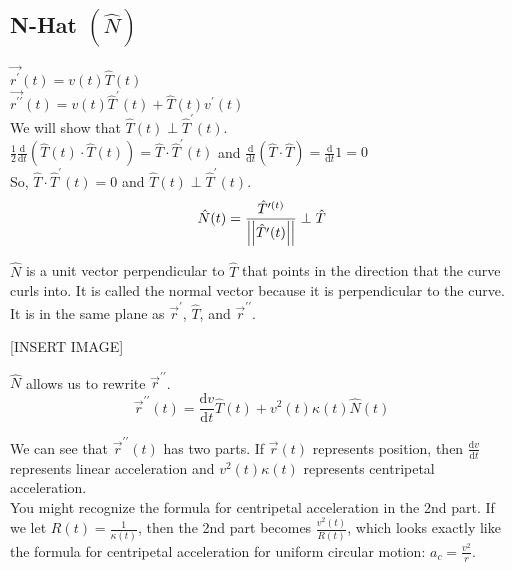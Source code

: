 \subsection{N-Hat $\left(\hat{N}\right)$}
\noindent
$\vec{r^{\prime}}(t)=v(t)\hat{T}(t)$\\
$\vec{r^{\prime\prime}}(t)=v(t)\hat{T}^{\prime}(t)+\hat{T}(t)v^{\prime}(t)$\\

\noindent
We will show that $\hat{T}(t)\perp\hat{T}^{\prime}(t)$.\\
\indent
$\frac{1}{2}\frac{\mathrm{d}}{\mathrm{d}t}\left(\hat{T}(t)\cdot\hat{T}(t)\right)=\hat{T}\cdot\hat{T}^{\prime}(t)$ and $\frac{\mathrm{d}}{\mathrm{d}t}\left(\hat{T}\cdot\hat{T}\right)=\frac{\mathrm{d}}{\mathrm{d}t}1=0$\\
\indent
So, $\hat{T}\cdot\hat{T}^{\prime}(t)=0$ and $\hat{T}(t)\perp\hat{T}^{\prime}(t)$.\\
\noindent
$$\hat{N}(t)=\frac{\hat{T}^{\prime(t)}}{\left|\left|\hat{T}^{\prime}(t)\right|\right|}\perp\hat{T}$$

\noindent
$\hat{N}$ is a unit vector perpendicular to $\hat{T}$ that points in the direction that the curve curls into. It is called the normal vector because it is perpendicular to the curve. It is in the same plane as $\vec{r}^\prime$, $\hat{T}$, and  $\vec{r}^{\prime\prime}$.

[INSERT IMAGE]

\noindent
$\hat{N}$ allows us to rewrite $\vec{r}^{\prime\prime}$.\\ $$\vec{r}^{\prime\prime}(t)=\frac{\mathrm{d}v}{\mathrm{d}t}\hat{T}(t)+v^{2}(t)\kappa(t)\hat{N}(t)$$

\noindent
We can see that $\vec{r}^{\prime\prime}(t)$ has two parts. If $\vec{r}(t)$ represents position, then $\frac{\mathrm{d}v}{\mathrm{d}t}$ represents linear acceleration and $v^2(t)\kappa(t)$ represents centripetal acceleration.\\ 
You might recognize the formula for centripetal acceleration in the 2nd part. If we let $R(t)=\frac{1}{\kappa(t)}$, then the 2nd part becomes $\frac{v^2(t)}{R(t)}$, which looks exactly like the formula for centripetal acceleration for uniform circular motion: $a_c=\frac{v^2}{r}$.
